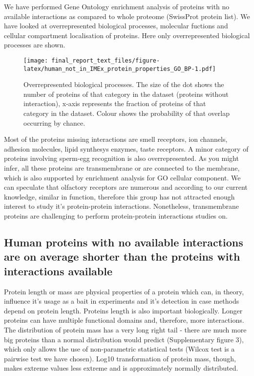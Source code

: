 \documentclass[12pt,]{report}
\begin{document}
We have performed Gene Ontology enrichment analysis of proteins with no
available interactions as compared to whole proteome (SwissProt protein
list). We have looked at overrepresented biological processes, molecular
fuctions and cellular compartment localisation of proteins. Here only
overrepresented biological processes are shown.

\begin{figure}
\centering
\texttt{[image: final\_report\_text\_files/figure-latex/human\_not\_in\_IMEx\_protein\_properties\_GO\_BP-1.pdf]}
\caption{Overrepresented biological processes. The size of the dot shows
the number of proteins of that category in the dataset (proteins without
interaction), x-axis represents the fraction of proteins of that
category in the dataset. Colour shows the probability of that overlap
occurring by chance.}
\end{figure}

Most of the proteins missing interactions are smell receptors, ion
channels, adhesion molecules, lipid synthesys enzymes, taste receptors.
A minor category of proteins involving sperm-egg recognition is also
overrepresented. As you might infer, all these proteins are
transmembrane or are connected to the membrane, which is also supported
by enrichment analysis for GO cellular component. We can speculate that
olfactory receptors are numerous and according to our current knowledge,
similar in function, therefore this group has not attracted enough
interest to study it's protein-protein interactions. Nonetheless,
transmembrane proteins are challenging to perform protein-protein
interactions studies on.

\subsection{Human proteins with no available interactions are on average
shorter than the proteins with interactions
available}\label{human-proteins-with-no-available-interactions-are-on-average-shorter-than-the-proteins-with-interactions-available}

Protein length or mass are physical properties of a protein which can,
in theory, influence it's usage as a bait in experiments and it's
detection in case methods depend on protein length. Proteins length is
also important biologically. Longer proteins can have multiple
functional domains and, therefore, more interactions. The distribution
of protein mass has a very long right tail - there are much more big
proteins than a normal distribution would predict (Supplementary figure
3), which only allows the use of non-parametric statistical tests
(Wilcox test is a pairwise test we have chosen). Log10 transformation of
protein mass, though, makes extreme values less extreme and is
approximately normally distributed.
\end{document}

